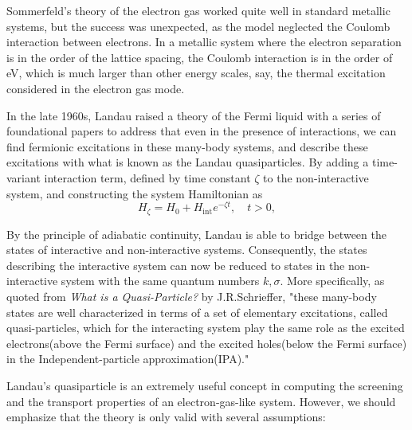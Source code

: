 Sommerfeld's theory of the electron gas worked quite well in standard metallic systems, but the success was unexpected, as the model neglected the Coulomb interaction between electrons. In a metallic system where the electron separation is in the order of the lattice spacing, the Coulomb interaction is in the order of eV, which is much larger than other energy scales, say, the thermal excitation considered in the electron gas mode. 

In the late 1960s, Landau raised a theory of the Fermi liquid with a series of foundational papers\cite{Landau1956}\cite{Landau1957} to address that even in the presence of interactions, we can find fermionic excitations in these many-body systems, and describe these excitations with what is known as the Landau quasiparticles. By adding a time-variant interaction term, defined by time constant $\zeta$ to the non-interactive system, and constructing the system Hamiltonian as
\begin{equation}\label{adiabatic}
	H_{\zeta} = H_0 + H_{\text{int}} e^{-\zeta t}, \quad t > 0,
\end{equation}

By the principle of adiabatic continuity, Landau is able to bridge between the states of interactive and non-interactive systems. Consequently, the states describing the interactive system can now be reduced to states in the non-interactive system with the same quantum numbers $k, \sigma$. More specifically, as quoted from \textit{What is a Quasi-Particle?} by J.R.Schrieffer, "these many-body states are well characterized in terms of a set of elementary excitations, called quasi-particles, which for the interacting system play the same role as the excited electrons(above the Fermi surface) and the excited holes(below the Fermi surface) in the Independent-particle approximation(IPA)." \cite{schriefferWhatQuasiparticle1970}

Landau's quasiparticle is an extremely useful concept in computing the screening and the transport properties of an electron-gas-like system. However, we should emphasize that the theory is only valid with several assumptions:

